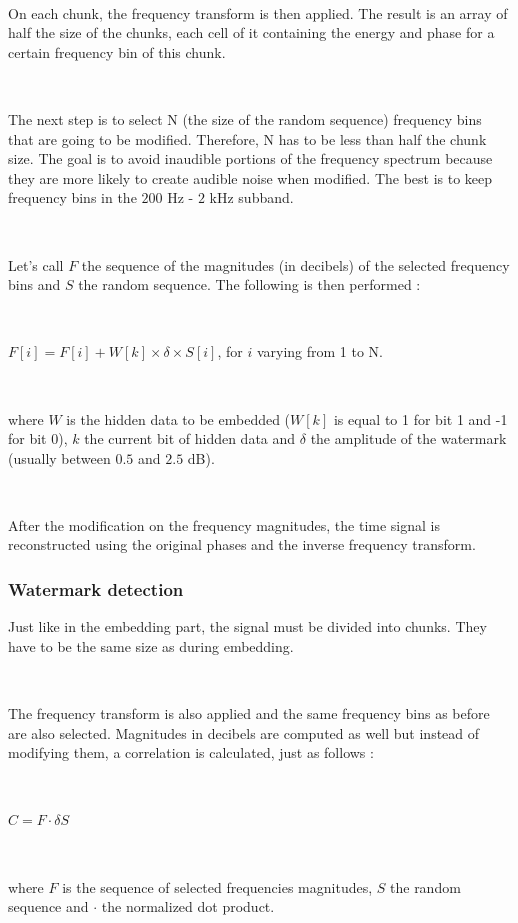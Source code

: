 ~

On each chunk, the frequency transform is then applied. The result is an array of half the size of the chunks, each cell of it containing the energy and phase for a certain frequency bin of this chunk.

~

The next step is to select N (the size of the random sequence) frequency bins that are going to be modified. Therefore, N has to be less than half the chunk size. The goal is to avoid inaudible portions of the frequency spectrum because they are more likely to create audible noise when modified. The best is to keep frequency bins in the $200$ Hz - $2$ kHz subband.

~

Let's call $F$ the sequence of the magnitudes (in decibels) of the selected frequency bins and $S$ the random sequence. The following is then performed :

~

$F[i] = F[i] + W[k] \times \delta \times S[i]$, for $i$ varying from 1 to N.

~

\noindent where $W$ is the hidden data to be embedded ($W[k]$ is equal to 1 for bit 1 and -1 for bit 0), $k$ the current bit of hidden data and $\delta$ the amplitude of the watermark (usually between $0.5$ and $2.5$ dB).

~

After the modification on the frequency magnitudes, the time signal is reconstructed using the original phases and the inverse frequency transform.

\subsubsection{Watermark detection}

Just like in the embedding part, the signal must be divided into chunks. They have to be the same size as during embedding.

~

The frequency transform is also applied and the same frequency bins as before are also selected. Magnitudes in decibels are computed as well but instead of modifying them, a correlation is calculated, just as follows :

~

$C = F \cdot \delta S$

~

\noindent where $F$ is the sequence of selected frequencies magnitudes, $S$ the random sequence and $\cdot$ the normalized dot product.

